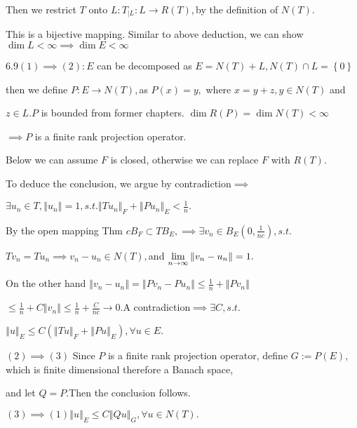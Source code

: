 \documentclass{article}
\begin{document}
Then we restrict $T$ onto $L:T_{|L}:L\rightarrow R\left( T\right) ,$by the
definition of $N\left( T\right) .$

This is a bijective mapping. Similar to above deduction, we can show $\dim
L<\infty \implies \dim E<\infty $

6.9$\left( 1\right) \implies \left( 2\right) :E$ can be decomposed as $%
E=N\left( T\right) +L,N\left( T\right) \cap L=\left\{ 0\right\} $

then we define $P:E\rightarrow N\left( T\right) ,$as $P\left( x\right) =y,$%
where $x=y+z,y\in N\left( T\right) $ and 

$z\in L.P$ is bounded from former chapters. $\dim R\left( P\right) =\dim
N\left( T\right) <\infty $

$\implies P$ is a finite rank projection operator. 

Below we can assume $F$ is closed, otherwise we can replace $F$ with $%
R\left( T\right) .$

To deduce the conclusion, we argue by contradiction$\implies $

$\exists u_{n}\in T,\left\Vert u_{n}\right\Vert =1,s.t.\left\Vert
Tu_{n}\right\Vert _{F}+\left\Vert Pu_{n}\right\Vert _{E}<\frac{1}{n}.$

By the open mapping Thm $cB_{F}\subset TB_{E},\implies \exists v_{n}\in
B_{E}\left( 0,\frac{1}{nc}\right) ,s.t.$

$Tv_{n}=Tu_{n}\implies v_{n}-u_{n}\in N\left( T\right) ,$and $\underset{%
n\rightarrow \infty }{\lim }\left\Vert v_{n}-u_{n}\right\Vert =1.$

On the other hand $\left\Vert v_{n}-u_{n}\right\Vert =\left\Vert
Pv_{n}-Pu_{n}\right\Vert \leq \frac{1}{n}+\left\Vert Pv_{n}\right\Vert $

$\leq \frac{1}{n}+C\left\Vert v_{n}\right\Vert \leq \frac{1}{n}+\frac{C}{nc}%
\rightarrow 0.$A contradiction$\implies \exists C,s.t.$

$\left\Vert u\right\Vert _{E}\leq C\left( \left\Vert Tu\right\Vert
_{F}+\left\Vert Pu\right\Vert _{E}\right) ,\forall u\in E.$

$\left( 2\right) \implies \left( 3\right) $ Since $P$ is a finite rank
projection operator, define $G:=P\left( E\right) ,$which is finite
dimensional therefore a Banach space,

and let $Q=P.$Then the conclusion follows.

$\left( 3\right) \implies \left( 1\right) \left\Vert u\right\Vert _{E}\leq
C\left\Vert Qu\right\Vert _{G},\forall u\in N\left( T\right) .$
\end{document}
